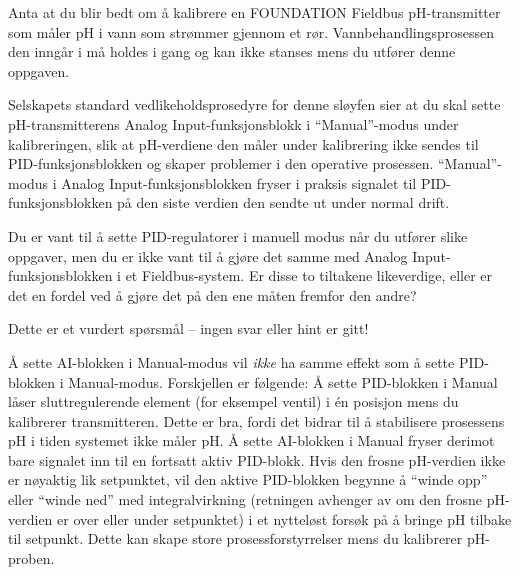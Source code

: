 
Anta at du blir bedt om å kalibrere en FOUNDATION Fieldbus pH-transmitter som måler pH i vann som strømmer gjennom et rør. Vannbehandlingsprosessen den inngår i må holdes i gang og kan ikke stanses mens du utfører denne oppgaven.

Selskapets standard vedlikeholdsprosedyre for denne sløyfen sier at du skal sette pH-transmitterens Analog Input-funksjonsblokk i ``Manual''-modus under kalibreringen, slik at pH-verdiene den måler under kalibrering ikke sendes til PID-funksjonsblokken og skaper problemer i den operative prosessen. ``Manual''-modus i Analog Input-funksjonsblokken fryser i praksis signalet til PID-funksjonsblokken på den siste verdien den sendte ut under normal drift.

\vskip 10pt

Du er vant til å sette PID-regulatorer i manuell modus når du utfører slike oppgaver, men du er ikke vant til å gjøre det samme med Analog Input-funksjonsblokken i et Fieldbus-system. Er disse to tiltakene likeverdige, eller er det en fordel ved å gjøre det på den ene måten fremfor den andre?

\vfil

\eject






Dette er et vurdert spørsmål -- ingen svar eller hint er gitt!







Å sette AI-blokken i Manual-modus vil {\it ikke} ha samme effekt som å sette PID-blokken i Manual-modus. Forskjellen er følgende: Å sette PID-blokken i Manual låser sluttregulerende element (for eksempel ventil) i én posisjon mens du kalibrerer transmitteren. Dette er bra, fordi det bidrar til å stabilisere prosessens pH i tiden systemet ikke måler pH. Å sette AI-blokken i Manual fryser derimot bare signalet inn til en fortsatt aktiv PID-blokk. Hvis den frosne pH-verdien ikke er nøyaktig lik setpunktet, vil den aktive PID-blokken begynne å ``winde opp'' eller ``winde ned'' med integralvirkning (retningen avhenger av om den frosne pH-verdien er over eller under setpunktet) i et nytteløst forsøk på å bringe pH tilbake til setpunkt. Dette kan skape store prosessforstyrrelser mens du kalibrerer pH-proben.

